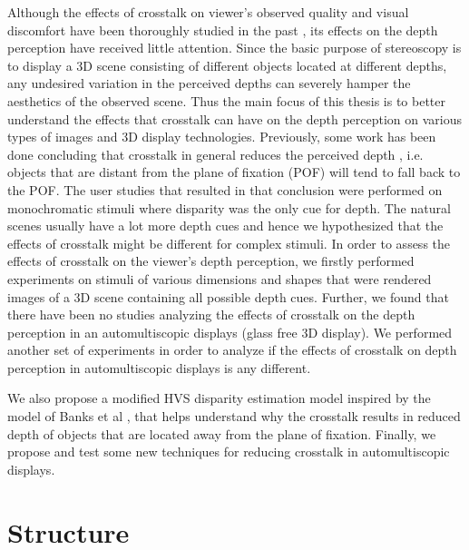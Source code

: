Although the effects of crosstalk on viewer's observed quality and visual discomfort have been thoroughly studied in the past \cite{wilcox2003determinants}, its effects on the depth perception have received little attention. Since the basic purpose of stereoscopy is to display a 3D scene consisting of different objects located at different depths, any undesired variation in the perceived depths can severely hamper the aesthetics of the observed scene. Thus the main focus of this thesis is to better understand the effects that crosstalk can have on the depth perception on various types of images and 3D display technologies. Previously, some  work has been done concluding that crosstalk in general reduces the perceived depth \cite{tsirlin2012effect}, i.e. objects that are distant from the plane of fixation (POF) will tend to fall back to the POF. The user studies that resulted in that conclusion were performed on monochromatic stimuli where disparity was the only cue for depth. The natural scenes usually have a lot more depth cues and hence we hypothesized that the effects of crosstalk might be different for complex stimuli. In order to assess the effects of crosstalk on the viewer's depth perception, we firstly performed experiments on stimuli of various dimensions and shapes that were rendered images of a 3D scene containing all possible depth cues. Further, we found that there have been no studies analyzing the effects of crosstalk on the depth perception in an automultiscopic displays (glass free 3D display). We performed another set of experiments in order to analyze if the effects of crosstalk on depth perception in automultiscopic displays is any different.

We also propose a modified HVS disparity estimation model inspired by the model of Banks et al \cite{filippini2009limits}, that helps understand why the crosstalk results in reduced depth of objects that are located away from the plane of fixation. Finally, we propose and test some new techniques for reducing crosstalk in automultiscopic displays.

\section{Structure}

